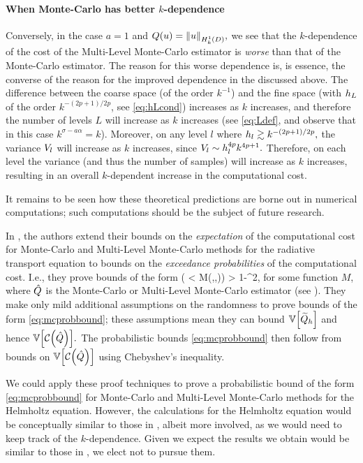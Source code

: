 \paragraph{When Monte-Carlo has better $k$-dependence} Conversely, in the case  $a=1$ and $Q(u) = \NHokD{u},$ we see that the $k$-dependence of the cost of the Multi-Level Monte-Carlo estimator is \emph{worse} than that of the Monte-Carlo estimator. The reason for this worse dependence is, is essence, the converse of the reason for the improved dependence in the discussed above. The difference between the coarse space (of the order $k^{-1}$) and the fine space (with $h_{L}$ of the order $k^{-(2p+1)/2p}$, see \cref{eq:hLcond}) increases as $k$ increases, and therefore the number of levels $L$ will increase as $k$ increases (see \cref{eq:Ldef}, and observe that in this case $k^{\sigma - a\alpha} = k$). Moreover, on any level $l$ where $h_{l} \gtrsim k^{-(2p+1)/2p},$ the variance $V_{l}$ will increase as $k$ increases, since $V_{l} \sim h_{l}^{4p}k^{4p+1}.$ Therefore, on each level the variance (and thus the number of samples) will increase as $k$ increases, resulting in an overall $k$-dependent increase in the computational cost.

It remains to be seen how these theoretical predictions are borne out in numerical computations; such computations should be the subject of future research.


In \cite{GrPaSc:19}, the authors extend their bounds on the \emph{expectation} of the computational cost for Monte-Carlo and Multi-Level Monte-Carlo methods for the radiative transport equation to bounds on the \emph{exceedance probabilities} of the computational cost. I.e., they prove bounds of the form
\beq\label{eq:mcprobbound}
\PP\mleft(\Cost{\Qhat} < M(\eps,\delta,\Qhat)\mright) > 1-\delta^2,
\eeq
for some function $M$, where $\hat{Q}$ is the Monte-Carlo or Multi-Level Monte-Carlo estimator (see \cite[Theorems 5.12 and 5.13]{GrPaSc:19}). They make only mild additional assumptions on the randomness to prove bounds of the form \cref{eq:mcprobbound}; these assumptions mean they can bound $\VAR{\Qhtilde}$ and hence $\VAR{\Cost{\Qhat}}.$ The probabilistic bounds \cref{eq:mcprobbound} then follow from bounds on $\VAR{\Cost{\Qhat}}$ using Chebyshev's inequality.

We could apply these proof techniques to prove a probabilistic bound of the form \cref{eq:mcprobbound} for Monte-Carlo and Multi-Level Monte-Carlo methods for the Helmholtz equation. However, the calculations for the Helmholtz equation would be conceptually similar to those in \cite{GrPaSc:19}, albeit more involved, as we would need to keep track of the $k$-dependence. Given we expect the results we obtain would be similar to those in \cite{GrPaSc:19}, we elect not to pursue them.
\ere

